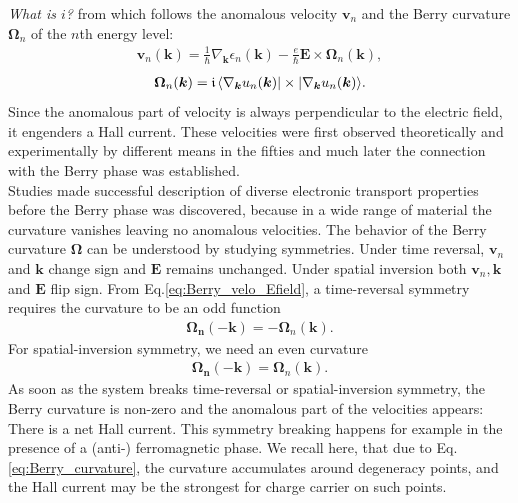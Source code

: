 \documentclass[../main]{subfiles}
\begin{document}
    \textit{What is $i$?} from which follows the anomalous velocity $\bm{v}_n$ and the Berry curvature $\bm{\Omega}_n$ of the $n$th energy level:
    \begin{align}\label{eq:Berry_velo_Efield}
        \bm{v}_n(\bm{k}) = \frac{1}{\hbar}\nabla_{\bm{k}}\epsilon_n(\bm{k}) - \frac{e}{\hbar} \bm{E}\times\bm{\Omega}_n(\bm{k}),
    \end{align}
    \begin{align*}
        \bm{\Omega}_n(\bm{k}) = \large\mathfrak{i}\hspace*{1.3pt}\normalsize \langle \nabla_{\bm{k}} u_n(\bm{k}) | \times | \nabla_{\bm{k}} u_n(\bm{k})\rangle.
    \end{align*}
    Since the anomalous part of velocity is always perpendicular to the electric field, it engenders a Hall current. 
    These velocities were first observed theoretically and experimentally by different means in the fifties \cite{Adams1952-ig,Karplus1954-xi,Kohn1957-nd}
    and much later the connection with the Berry phase was established. \\

    Studies made successful description of diverse electronic transport properties before the Berry phase was discovered, because in a wide range of material the curvature vanishes leaving no 
    anomalous velocities. The behavior of the Berry curvature $\bm{\Omega}$ can be understood by studying symmetries. Under time reversal, $\bm{v}_n$ and $\bm{k}$ change sign and
    $\bm{E}$ remains unchanged. Under spatial inversion both $\bm{v}_n,\bm{k}$  and $\bm{E}$ flip sign. From Eq.\ref{eq:Berry_velo_Efield}, a time-reversal symmetry requires the curvature
    to be an odd function
    \begin{align*}
        \bm{\Omega_n}(-\bm{k}) = -\bm{\Omega}_n(\bm{k}).
    \end{align*}
    For spatial-inversion symmetry, we need an even curvature   
     \begin{align*}
        \bm{\Omega_n}(-\bm{k}) = \bm{\Omega}_n(\bm{k}).
    \end{align*}
    As soon as the system breaks time-reversal or spatial-inversion symmetry, the Berry curvature is non-zero and the anomalous part of the velocities appears: There is a net Hall current.
    This symmetry breaking happens for example in the presence of a (anti-) ferromagnetic phase. We recall here, that due to Eq.\ref{eq:Berry_curvature}, the curvature accumulates around degeneracy points,
    and the Hall current may be the strongest for charge carrier on such points.

    
\end{document}
